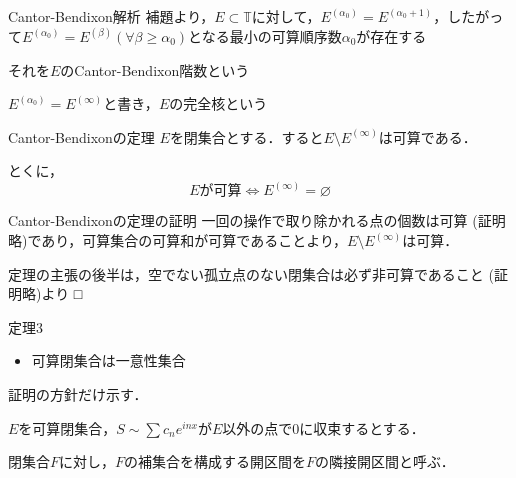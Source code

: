 \documentclass[dvipdfmx,17pt]{beamer}
\theoremstyle{plain}
\newcommand{\R}{\mathbb{R}}
\begin{document}
%
%
%
%
%


\begin{frame}{Cantor-Bendixon解析}
補題より，$E \subset \mathbb{T}$に対して，$E^{(\alpha_0)} = E^{(\alpha_0+1)}$，したがって$E^{(\alpha_0)} = E^{(\beta)} (\forall \beta \geq \alpha_0)$となる最小の可算順序数$\alpha_0$が存在する

それを$E$のCantor-Bendixon階数という

\vspace{0.5cm}
$E^{(\alpha_0)} = E^{(\infty)}$と書き，$E$の完全核という
\end{frame}

\begin{frame}{Cantor-Bendixonの定理}
$E$を閉集合とする．すると$E \setminus E^{(\infty)}$は可算である．

とくに，
\[E\text{が可算} \iff E^{(\infty)} = \varnothing\]
\end{frame}

\begin{frame}{Cantor-Bendixonの定理の証明}
一回の操作で取り除かれる点の個数は可算 (証明略)であり，可算集合の可算和が可算であることより，$E \setminus E^{(\infty)}$は可算．

\vspace{0.5cm}
定理の主張の後半は，空でない孤立点のない閉集合は必ず非可算であること (証明略)より □
\end{frame}

\begin{frame}{定理3}
\begin{itemize}
\item 可算閉集合は一意性集合
\end{itemize}

証明の方針だけ示す．

$E$を可算閉集合，$S \sim \sum c_n e^{inx}$が$E$以外の点で$0$に収束するとする．

閉集合$F$に対し，$F$の補集合を構成する開区間を$F$の隣接開区間と呼ぶ．
\end{frame}
\end{document}
